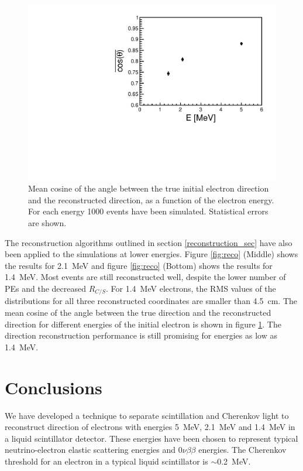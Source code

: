 \documentclass[cits]{JINST}
\begin{document}
\begin{figure}
        \begin{center}
        \includegraphics[scale=0.4]{graphs/hCos_vs_E_final.pdf}
        \caption[]{Mean cosine of the angle between the true initial electron direction and the reconstructed direction, as a function of the electron energy. For each energy 1000 events have been simulated. Statistical errors are
shown. \label{Edep_angle}}
        \end{center}
\end{figure}

The reconstruction algorithms outlined in section \ref{reconstruction_sec} have also been applied
to the simulations at lower energies. Figure \ref{fig:reco} (Middle) shows the results for 2.1~MeV and figure \ref{fig:reco} (Bottom) shows the results for 1.4~MeV. Most events are still reconstructed well, despite the lower
number of PEs and the decreased $R_{C/S}$. For 1.4~MeV electrons, the RMS values of the distributions for all three
reconstructed coordinates are smaller than 4.5~cm. The mean cosine of the angle between the true direction
and the reconstructed direction for different energies of the initial electron is shown in figure
\ref{Edep_angle}. The direction reconstruction performance is still promising for energies as low as 1.4~MeV.

\section{Conclusions}

We have developed a technique to separate scintillation and Cherenkov light to reconstruct direction of electrons with energies 5~MeV, 2.1~MeV and 1.4~MeV in a liquid scintillator detector. These energies have been chosen to represent typical neutrino-electron elastic scattering energies and
$0\nu\beta\beta$ energies. The Cherenkov threshold for an electron in a typical liquid scintillator is $\sim$0.2~MeV.
\end{document}
